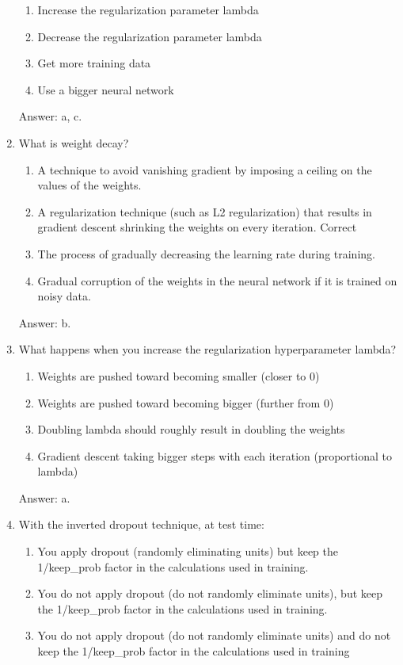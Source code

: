 \documentclass[12pt]{article}
\numberwithin{equation}{section}
\begin{document}
\begin{enumerate}
	\begin{enumerate}
		\item Increase the regularization parameter lambda
		\item Decrease the regularization parameter lambda
		\item Get more training data
		\item Use a bigger neural network
	\end{enumerate}\par
	Answer: a, c.
	\item What is weight decay?
	\begin{enumerate}
		\item A technique to avoid vanishing gradient by imposing a ceiling on the values of the weights.
		\item A regularization technique (such as L2 regularization) that results in gradient descent shrinking the weights on every iteration.
Correct 
		\item The process of gradually decreasing the learning rate during training.
		\item Gradual corruption of the weights in the neural network if it is trained on noisy data.
	\end{enumerate}\par
	Answer: b.
	\item What happens when you increase the regularization hyperparameter lambda?
	\begin{enumerate}
		\item Weights are pushed toward becoming smaller (closer to 0)
		\item Weights are pushed toward becoming bigger (further from 0)
		\item Doubling lambda should roughly result in doubling the weights
		\item Gradient descent taking bigger steps with each iteration (proportional to lambda)
	\end{enumerate}\par
	Answer: a.
	\item With the inverted dropout technique, at test time:
	\begin{enumerate}
		\item You apply dropout (randomly eliminating units) but keep the 1/keep\_prob factor in the calculations used in training.
		\item You do not apply dropout (do not randomly eliminate units), but keep the 1/keep\_prob factor in the calculations used in training.
		\item You do not apply dropout (do not randomly eliminate units) and do not keep the 1/keep\_prob factor in the calculations used in training

\end{enumerate}
\end{enumerate}
\end{document}
